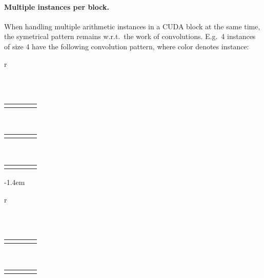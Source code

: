 \paragraph{Multiple instances per block.}
When handling multiple arithmetic instances in a CUDA block at the same time,
the symetrical pattern remains w.r.t.\ the work of convolutions. E.g.\ 4
instances of size 4 have the following convolution pattern, where color denotes
instance:
\begin{center}
  \begin{tabular}{r}
    \begin{tabular}{|C{0.1cm}|C{0.1cm}|C{0.1cm}|C{0.1cm}|}
      \hline
       \cgray & \cgray &\cgray  &\cgray \\
      \hline
    \end{tabular}\\[0.1ex]
    \begin{tabular}{C{0.1cm}|C{0.1cm}|C{0.1cm}|C{0.1cm}|}
       & \cgray & \cgray & \cgray\\
    \end{tabular}\\[0.1ex]
    \begin{tabular}{C{0.1cm}C{0.1cm}|C{0.1cm}|C{0.1cm}|}
       &  & \cgray & \cgray\\
    \end{tabular}\\[0.1ex]
    \begin{tabular}{C{0.1cm}C{0.1cm}C{0.1cm}|C{0.1cm}|}
       &  &  & \cgray \\
    \end{tabular}
  \end{tabular}
  \kern-1.4em
  \begin{tabular}{r}
    \begin{tabular}{C{0.1cm}|C{0.1cm}|C{0.1cm}|C{0.1cm}|}
      \hline
      \cbeige &\cbeige  &\cbeige  &\cbeige \\
      \hline
    \end{tabular}\\[0.1ex]
    \begin{tabular}{C{0.1cm}|C{0.1cm}|C{0.1cm}|C{0.1cm}|}
       & \cbeige & \cbeige & \cbeige\\
    \end{tabular}\\[0.1ex]
    \begin{tabular}{C{0.1cm}C{0.1cm}|C{0.1cm}|C{0.1cm}|}
       &  & \cbeige &\cbeige \\

\end{tabular}
\end{tabular}
\end{center}
